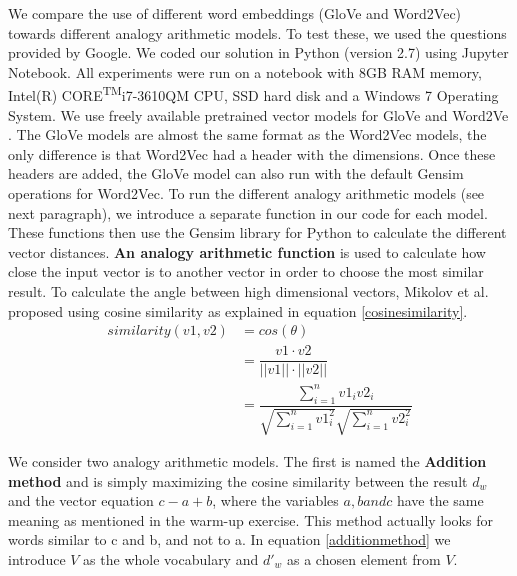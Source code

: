We compare the use of different word embeddings (GloVe and Word2Vec) towards different analogy arithmetic models\cite{marekreiblog}. To test these, we used the questions provided by Google\cite{word2vecquestionwords}.
\newline
\newline
We coded our solution in Python (version 2.7) using Jupyter Notebook. All experiments were run on a notebook with 8GB RAM memory, Intel(R) CORE\textsuperscript{TM}i7-3610QM CPU, SSD hard disk and a Windows 7 Operating System.
\newline
\newline
We use freely available pretrained vector models for GloVe \cite{glovedata} and Word2Ve \cite{word2vecdata}. The GloVe models are almost the same format as the Word2Vec models, the only difference is that Word2Vec had a header with the dimensions. Once these headers are added, the GloVe model can also run with the default Gensim operations for Word2Vec.
\newline
\newline
To run the different analogy arithmetic models (see next paragraph), we introduce a separate function in our code for each model. These functions then use the Gensim library for Python \cite{gensim} to calculate the different vector distances.
\newline
\newline
\textbf{An analogy arithmetic function} is used to calculate how close the input vector is to another vector in order to choose the most similar result. To calculate the angle between high dimensional vectors, Mikolov et al. \cite{mikolov} proposed using cosine similarity as explained in equation \ref{cosinesimilarity}. 
\begin{equation}
\begin{split}
\label{cosinesimilarity}
similarity(v1, v2) &= cos(\theta) \\&= \dfrac{v1 \cdot v2}{||v1|| \cdot ||v2||}  \\&= \dfrac{\sum_{i=1}^{n}v1_i v2_i}{\sqrt{\sum_{i=1}^{n}v1_i^2} \sqrt{\sum_{i=1}^{n} v2_i^2}}
\end{split}
\end{equation}

\leavevmode
\newline
We consider two analogy arithmetic models. The first is named the \textbf{Addition method} and is simply maximizing the cosine similarity between the result $d_w$ and the vector equation $c-a+b$, where the variables $a, b and c$ have the same meaning as mentioned in the warm-up exercise. This method actually looks for words similar to c and b, and not to a. In equation \ref{additionmethod} we introduce $V$ as the whole vocabulary and $d'_w$ as a chosen element from $V$.

